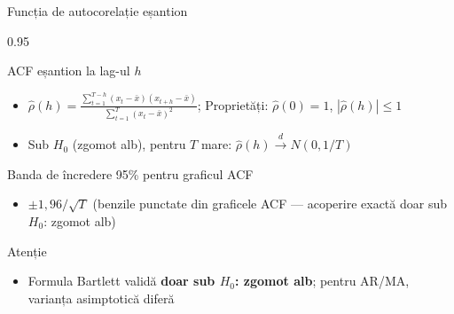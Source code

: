 \documentclass[9pt, aspectratio=169, t]{beamer}
\begin{document}
\begin{frame}{Funcția de autocorelație eșantion}
    \vspace{-0.2cm}
    \begin{cminipage}{0.95\textwidth}
        \vspace{-0.2cm}
        {\footnotesize
        \begin{block}{ACF eșantion la lag-ul $h$}
            \begin{itemize}\setlength{\itemsep}{0pt}
                \item $\hat{\rho}(h) = \frac{\sum_{t=1}^{T-h}(x_t - \bar{x})(x_{t+h} - \bar{x})}{\sum_{t=1}^{T}(x_t - \bar{x})^2}$; \;
                      Proprietăți: $\hat{\rho}(0) = 1$, $|\hat{\rho}(h)| \leq 1$
            \end{itemize}
        \end{block}
        \vspace{-1mm}
        \begin{thm}[Bartlett, 1946]
            \begin{itemize}\setlength{\itemsep}{0pt}
                \item Sub $H_0$ (zgomot alb), pentru $T$ mare: $\hat{\rho}(h) \xrightarrow{d} N(0, 1/T)$
            \end{itemize}
        \end{thm}
        \vspace{-1mm}
        \begin{block}{Banda de încredere 95\% pentru graficul ACF}
            \begin{itemize}\setlength{\itemsep}{0pt}
                \item $\pm 1{,}96/\sqrt{T}$ (benzile punctate din graficele ACF --- acoperire exactă doar sub $H_0$: zgomot alb)
            \end{itemize}
        \end{block}
        \vspace{-1mm}
        \begin{alertblock}{Atenție}
            \begin{itemize}\setlength{\itemsep}{0pt}
                \item Formula Bartlett validă \textbf{doar sub $H_0$: zgomot alb}; pentru AR/MA, varianța asimptotică diferă
            \end{itemize}
        \end{alertblock}
        }
    \end{cminipage}
\end{frame}
\end{document}
